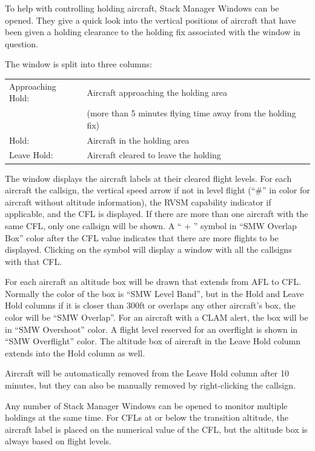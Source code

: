 \documentclass[11pt,a4paper]{memoir}
\newcommand{\colorref}[1]{\textit{\hyperref[#1]{\StrDel{#1}{color:}}}}
\begin{document}
To help with controlling holding aircraft, Stack Manager Windows can be opened. They give a quick look into the vertical positions of aircraft that have been given a holding clearance to the holding fix associated with the window in question.

The window is split into three columns:

\begin{tabular}{l l}
    Approaching Hold:   & Aircraft approaching the holding area\\
                        & (more than 5 minutes flying time away from the holding fix)\\
    Hold:               & Aircraft in the holding area\\
    Leave Hold:         & Aircraft cleared to leave the holding\\   
\end{tabular}

The window displays the aircraft labels at their cleared flight levels. For each aircraft the callsign, the vertical speed arrow if not in level flight (“\#” in \colorref{color:Warning} color for aircraft without altitude information), the RVSM capability indicator if applicable, and the CFL is displayed. If there are more than one aircraft with the same CFL, only one callsign will be shown. A “ + ” symbol in “SMW Overlap Box” color after the CFL value indicates that there are more flights to be displayed. Clicking on the symbol will display a window with all the callsigns with that CFL.

For each aircraft an altitude box will be drawn that extends from AFL to CFL. Normally the color of the box is “SMW Level Band”, but in the Hold and Leave Hold columns if it is closer than 300ft or overlaps any other aircraft’s box, the color will be “SMW Overlap”. For an aircraft with a CLAM alert, the box will be in “SMW Overshoot” color. A flight level reserved for an overflight is shown in “SMW Overflight” color. The altitude box of aircraft in the Leave Hold column extends into the Hold column as well.

Aircraft will be automatically removed from the Leave Hold column after 10 minutes, but they can also be manually removed by right-clicking the callsign.

Any number of Stack Manager Windows can be opened to monitor multiple holdings at the same time. For CFLs at or below the transition altitude, the aircraft label is placed on the numerical value of the CFL, but the altitude box is always based on flight levels.
\end{document}
